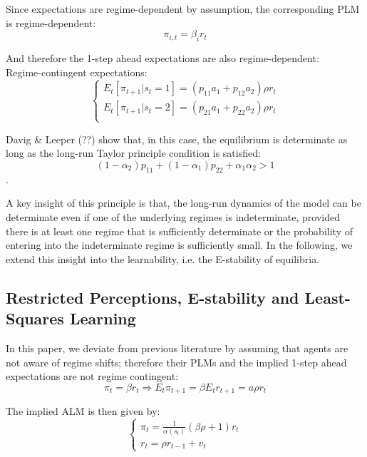 \documentclass[12pt,reqno]{article}
\numberwithin{equation}{section}
\begin{document}
Since expectations are regime-dependent by assumption, the corresponding PLM is regime-dependent: \\

$$
\pi_{i,t} = \beta_i r_t 
$$

And therefore the 1-step ahead expectations are also regime-dependent: \\

Regime-contingent expectations: \\

$$
\begin{cases}
E_t [\pi_{t+1} | s_t = 1] = (p_{11} a_1 + p_{12} a_2 ) \rho r_t \\
E_t [\pi_{t+1} | s_t = 2] = (p_{21} a_1 + p_{22} a_2 ) \rho r_t \\
\end{cases}
$$

Davig \& Leeper (??) show that, in this case, the equilibrium is determinate as long as the long-run Taylor principle condition is satisfied: \\


$$ (1-\alpha_2) p_{11} +(1-\alpha_1) p_{22} + \alpha_1 \alpha_2 > 1 $$. 

A key insight of this principle is that, the long-run dynamics of the model can be determinate even if one of the underlying regimes is indeterminate, provided there is at least one regime that is sufficiently determinate or the probability of entering into the indeterminate regime is sufficiently small. In the following, we extend this insight into the learnability, i.e. the E-stability of equilibria. 


 \subsection{Restricted Perceptions, E-stability and Least-Squares Learning}

In this paper, we deviate from previous literature by assuming that agents are not aware of regime shifts; therefore their PLMs and the implied 1-step ahead expectations are not regime contingent: \\

$$
\pi_t = \beta r_t  \Rightarrow E_t \pi_{t+1} = \beta E_t r_{t+1} = a \rho r_t 
$$

The implied ALM is then given by: \\

$$
\begin{cases}
\pi_t = \frac{1}{\alpha(s_t)} (\beta \rho + 1) r_t \\
r_t= \rho r_{t-1} + v_t 
\end{cases}
$$ 
\end{document}
